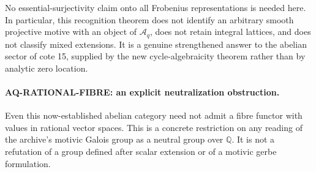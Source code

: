 \documentclass[11pt,a4paper]{article}
\theoremstyle{definition}\newtheorem{definition}[theorem]{Definition}
\theoremstyle{remark}\newtheorem{remark}[theorem]{Remark}
\begin{document}
No essential-surjectivity claim onto all Frobenius
representations is needed here. In particular,
this recognition theorem does not identify an
arbitrary smooth projective motive with an object
of $\mathcal A_q$, does not retain integral lattices,
and does not classify mixed extensions. It is a
genuine strengthened answer to the abelian sector
of cote 15, supplied by the new cycle-algebraicity
theorem rather than by analytic zero location.

\paragraph{AQ-RATIONAL-FIBRE: an explicit neutralization obstruction.}
Even this now-established abelian category need not
admit a fibre functor with values in rational vector
spaces. This is a concrete restriction on any reading
of the archive's motivic Galois group as a neutral
group over $\mathbb Q$. It is not a refutation of a
group defined after scalar extension or of a motivic
gerbe formulation.
\end{document}
